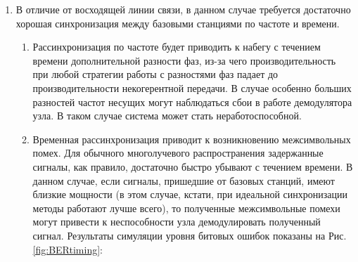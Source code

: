 \documentclass[a4paper,12pt,oneside, abstract=true]{scrartcl}
\begin{document}
\begin{enumerate}
Результат иллюстрирует Рис.\ref{fig:ErrorProbPlane}. Видно, что по мере увеличения числа пакетов эффект падает, поэтому передача большого количества тренировочных пакетов может быть нерациональной.

\begin{figure}[!htb]
\caption{Зависимость вероятности ошибки в бите от отношения сигнал-шум при разных k}
\label{fig:ErrorProbPlane}
\end{figure}
\FloatBarrier
При этом увеличение траффика вычисляется по простой формуле:
\begin{equation}
\frac{\Delta Tr}{Tr} = \frac{k}{L} * 100\%
\label{eq:Traffic}
\end{equation}

\item В отличие от восходящей линии связи, в данном случае требуется достаточно хорошая синхронизация между базовыми станциями по частоте и времени. 
\begin{enumerate}
\item Рассинхронизация по частоте будет приводить к набегу с течением времени дополнительной разности фаз, из-за чего производительность при любой стратегии работы с разностями фаз падает до производительности некогерентной передачи.
В случае особенно больших разностей частот несущих могут наблюдаться сбои в работе демодулятора узла.
В таком случае система может стать неработоспособной.

\item Временная рассинхронизация приводит к возникновению межсимвольных помех. 
Для обычного многолучевого распространения задержанные сигналы, как правило, достаточно быстро убывают с течением времени. 
В данном случае, если сигналы, пришедшие от базовых станций, имеют близкие мощности (в этом случае, кстати, при идеальной синхронизации методы работают лучше всего), то полученные межсимвольные помехи могут привести к неспособности узла демодулировать полученный сигнал.
Результаты симуляции уровня битовых ошибок показаны на Рис.\ref{fig:BERtiming}:


\end{enumerate}
\end{enumerate}
\end{document}
